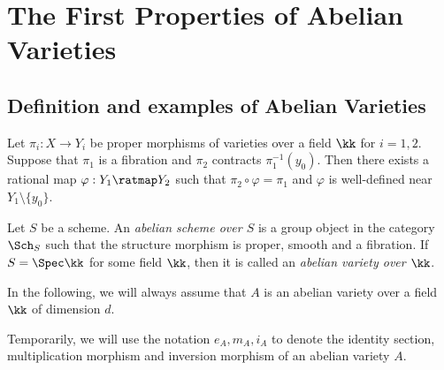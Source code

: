 \section{The First Properties of Abelian Varieties}

\subsection{Definition and examples of Abelian Varieties}
    \begin{theorem}\label{thm: Rigidity Lemma}
        Let \(\pi_i: X \to Y_i\) be proper morphisms of varieties over a field \(\kk\) for \(i=1,2\).
        Suppose that \(\pi_1\) is a fibration and \(\pi_2\) contracts \(\pi_1^{-1}(y_0)\).
        Then there exists a rational map \(\varphi: Y_1 \ratmap Y_2\) such that \(\pi_2 \circ \varphi = \pi_1\) and \(\varphi\) is well-defined near \(Y_1 \setminus \{y_0\}\). 
    \end{theorem}

    \begin{definition}\label{def: abelian varieties}
        Let \(S\) be a scheme.
        An \emph{abelian scheme over \(S\)} is a group object in the category \(\Sch_S\) such that the structure morphism is proper, smooth and a fibration.
        If \(S = \Spec \kk\) for some field \(\kk\), then it is called an \emph{abelian variety over \(\kk\)}.
    \end{definition}
    
    \begin{example}\label{eg: elliptic curves as abelian varieties}
        
    \end{example}

    \begin{example}\label{eg: product of abelian varieties as abelian varieties}
        
    \end{example}

    \begin{example}\label{eg: base change of abelian varieties as abelian varieties}
        
    \end{example}

    In the following, we will always assume that \(A\) is an abelian variety over a field \(\kk\) of dimension \(d\).

    Temporarily, we will use the notation \(e_A,m_A,i_A\) to denote the identity section, multiplication morphism and inversion morphism of an abelian variety \(A\).

